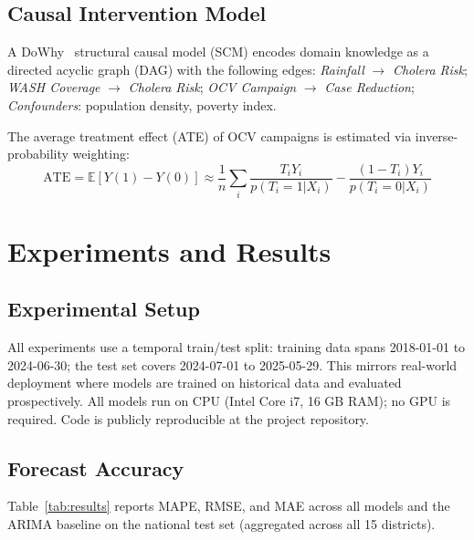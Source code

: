 \documentclass[conference]{IEEEtran}
\begin{document}
\subsection{Causal Intervention Model}

A DoWhy~\cite{dowhy2019} structural causal model (SCM) encodes domain knowledge
as a directed acyclic graph (DAG) with the following edges:
\textit{Rainfall} $\rightarrow$ \textit{Cholera Risk};
\textit{WASH Coverage} $\rightarrow$ \textit{Cholera Risk};
\textit{OCV Campaign} $\rightarrow$ \textit{Case Reduction};
\textit{Confounders}: population density, poverty index.

The average treatment effect (ATE) of OCV campaigns is estimated via
inverse-probability weighting:
\begin{equation}
    \text{ATE} = \mathbb{E}[Y(1) - Y(0)] \approx
    \frac{1}{n}\sum_i \frac{T_i Y_i}{p(T_i=1|X_i)} -
    \frac{(1-T_i)Y_i}{p(T_i=0|X_i)}
    \label{eq:ate}
\end{equation}


\section{Experiments and Results}
\label{sec:results}

\subsection{Experimental Setup}

All experiments use a temporal train/test split: training data spans 2018-01-01
to 2024-06-30; the test set covers 2024-07-01 to 2025-05-29. This mirrors
real-world deployment where models are trained on historical data and evaluated
prospectively. All models run on CPU (Intel Core i7, 16 GB RAM); no GPU is
required. Code is publicly reproducible at the project repository.

\subsection{Forecast Accuracy}

Table~\ref{tab:results} reports MAPE, RMSE, and MAE across all models and the
ARIMA baseline on the national test set (aggregated across all 15 districts).
\end{document}

